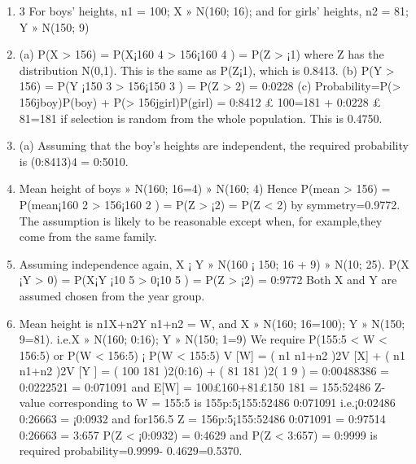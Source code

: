 \documentclass[a4paper,12pt]{article}
\begin{document}
\begin{enumerate}
    \item 3 For boys’ heights, n1 = 100; X » N(160; 16); and for girls’ heights, n2 = 81; Y » N(150; 9)
\item (a) P(X > 156) = P(X¡160
4 > 156¡160
4 ) = P(Z > ¡1) where Z has the distribution
N(0,1). This is the same as P(Z¡1), which is 0.8413.
(b) P(Y > 156) = P(Y ¡150
3 > 156¡150
3 ) = P(Z > 2) = 0:0228
(c) Probability=P(> 156jboy)P(boy) + P(> 156jgirl)P(girl) = 0:8412 £ 100=181 +
0:0228 £ 81=181 if selection is random from the whole population. This is 0.4750.
\item (a) Assuming that the boy’s heights are independent, the required probability is (0:8413)4
= 0:5010.
\item Mean height of boys » N(160; 16=4) » N(160; 4)
Hence P(mean > 156) = P(mean¡160
2 > 156¡160
2 ) = P(Z > ¡2) = P(Z < 2) by
symmetry=0.9772.
The assumption is likely to be reasonable except when, for example,they come from
the same family.
\item Assuming independence again, X ¡ Y » N(160 ¡ 150; 16 + 9) » N(10; 25).
P(X ¡Y > 0) = P(X¡Y ¡10
5 > 0¡10
5 ) = P(Z > ¡2) = 0:9772 Both X and Y are assumed
chosen from the year group.
\item  Mean height is n1X+n2Y
n1+n2
= W, and X » N(160; 16=100); Y » N(150; 9=81). i.e.X »
N(160; 0:16); Y » N(150; 1=9) We require P(155:5 < W < 156:5) or P(W < 156:5) ¡
P(W < 155:5)
V [W] = ( n1
n1+n2
)2V [X] + ( n1
n1+n2
)2V [Y ] = ( 100
181 )2(0:16) + ( 81
181 )2( 1
9 ) = 0:00488386 =
0:0222521 = 0:071091 and E[W] = 100£160+81£150
181 = 155:52486
Z-value corresponding to W = 155:5 is 155p:5¡155:52486
0:071091
i.e.¡0:02486
0:26663 = ¡0:0932 and for156.5
Z = 156p:5¡155:52486
0:071091
= 0:97514
0:26663 = 3:657
P(Z < ¡0:0932) = 0:4629 and P(Z < 3:657) = 0:9999 is required probability=0.9999-
0.4629=0.5370.

\end{enumerate}
\end{document}

